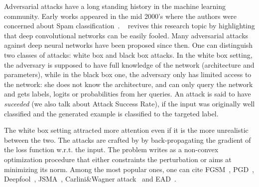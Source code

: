 
Adversarial attacks have a long standing history in the machine learning community. Early works appeared in the mid 2000's where the authors were concerned about Spam classification~\citep{biggio2009evade}. %
~\cite{Szegedy2013IntriguingPO} revives this research topic by highlighting that deep convolutional networks can be easily fooled. Many adversarial attacks against deep neural networks have been proposed since then. One can distinguish two classes of attacks: white box and black box attacks. In the white box setting, the adversary is supposed to have full knowledge of the network (architecture and parameters), while in the black box one, the adversary only has limited access to the network: she does not know the architecture, and can only query the network and gets labels, logits or probabilities from her queries.   An attack is said to have \textit{suceeded} (we also talk about Attack Success Rate), if the input was originally well classified and the generated example is classified to the targeted label.

The white box setting attracted more attention even if it is the more unrealistic between the two. The attacks are crafted by by back-propagating the gradient of the loss function w.r.t. the input. The problem writes as a non-convex optimization procedure that either constraints the perturbation or aims at minimizing its norm. Among the most popular ones, one can cite FGSM~\citep{goodfellow2014explaining}, PGD~\citep{kurakin2016adversarial,madry2018towards}, Deepfool~\citep{moosavi2016deepfool}, JSMA~\citep{Papernot2016TheLO}, Carlini\&Wagner attack~\citep{carlini2017towards} and EAD~\citep{chen2018ead}. 

